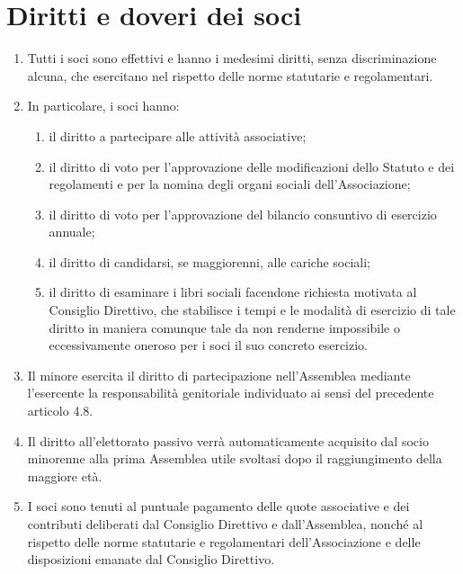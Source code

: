 \documentclass{djtsasddoc}
\begin{document}
	\section{Diritti e doveri dei soci}
	\begin{enumerate}
		\item Tutti i soci sono effettivi e hanno i medesimi diritti, senza discriminazione alcuna, che esercitano nel rispetto delle norme statutarie e regolamentari.
		\item In particolare, i soci hanno:
		\begin{enumerate}
			\item il diritto a partecipare alle attività associative;
			\item il diritto di voto per l'approvazione delle modificazioni dello Statuto e dei regolamenti e per la nomina degli organi sociali dell'Associazione;
			\item il diritto di voto per l'approvazione del bilancio consuntivo di esercizio annuale;
			\item il diritto di candidarsi, se maggiorenni, alle cariche sociali;
			\item il diritto di esaminare i libri sociali facendone richiesta motivata al Consiglio Direttivo, che stabilisce i tempi e le modalità di esercizio di tale diritto in maniera comunque tale da non renderne impossibile o eccessivamente oneroso per i soci il suo concreto esercizio.
		\end{enumerate}
		\item Il minore esercita il diritto di partecipazione nell'Assemblea mediante l'esercente la responsabilità genitoriale individuato ai sensi del precedente articolo 4.8.
		\item Il diritto all'elettorato passivo verrà automaticamente acquisito dal socio minorenne alla prima Assemblea utile svoltasi dopo il raggiungimento della maggiore età.
		\item I soci sono tenuti al puntuale pagamento delle quote associative e dei contributi deliberati dal Consiglio Direttivo e dall'Assemblea, nonché al rispetto delle norme statutarie e regolamentari dell'Associazione e delle disposizioni emanate dal Consiglio Direttivo.
	\end{enumerate}
	
\end{document}

